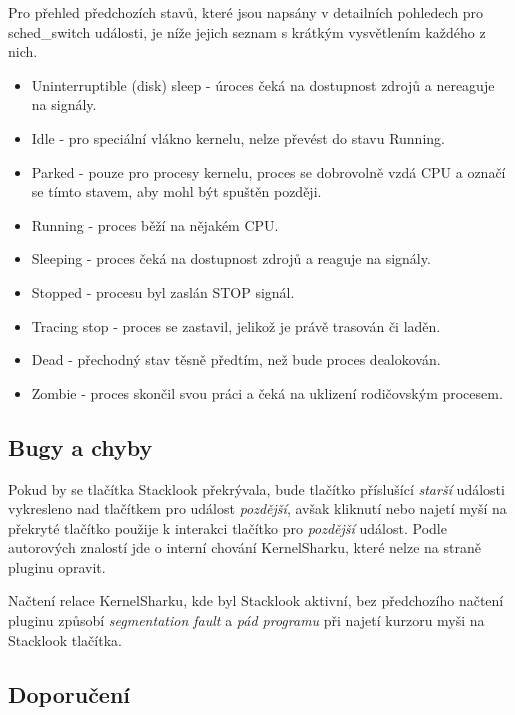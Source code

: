 Pro přehled předchozích stavů, které jsou napsány v detailních pohledech pro sched\_switch události, je níže jejich seznam s krátkým vysvětlením každého z nich.
\begin{itemize}
  \item Uninterruptible (disk) sleep - úroces čeká na dostupnost zdrojů a nereaguje na signály.
  \item Idle - pro speciální vlákno kernelu, nelze převést do stavu Running.
  \item Parked - pouze pro procesy kernelu, proces se dobrovolně vzdá CPU a označí se tímto stavem, aby mohl být spuštěn později. 
  \item Running - proces běží na nějakém CPU.
  \item Sleeping - proces čeká na dostupnost zdrojů a reaguje na signály.
  \item Stopped - procesu byl zaslán STOP signál.
  \item Tracing stop - proces se zastavil, jelikož je právě trasován či laděn.
  \item Dead - přechodný stav těsně předtím, než bude proces dealokován.
  \item Zombie - proces skončil svou práci a čeká na uklizení rodičovským procesem.
\end{itemize}

\subsection{Bugy a chyby}

Pokud by se tlačítka Stacklook překrývala, bude tlačítko příslušící \emph{starší} události vykresleno nad tlačítkem pro událost \emph{pozdější}, avšak kliknutí nebo najetí myší na překryté tlačítko použije k interakci tlačítko pro \emph{pozdější} událost. Podle autorových znalostí jde o interní chování KernelSharku, které nelze na straně pluginu opravit.

Načtení relace KernelSharku, kde byl Stacklook aktivní, bez předchozího načtení pluginu způsobí \emph{segmentation fault} a \emph{pád programu} při najetí kurzoru myši na Stacklook tlačítka.

\subsection{Doporučení}

